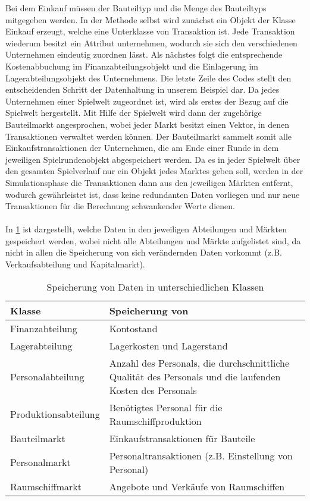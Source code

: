 Bei dem Einkauf müssen der Bauteiltyp und die Menge des Bauteiltyps mitgegeben werden. In der Methode selbst wird zunächst ein Objekt der Klasse Einkauf erzeugt, welche eine Unterklasse von Transaktion ist. Jede Transaktion wiederum besitzt ein Attribut unternehmen, wodurch sie sich den verschiedenen Unternehmen eindeutig zuordnen lässt. Als nächstes folgt die entsprechende Kostenabbuchung im Finanzabteilungsobjekt und die Einlagerung im Lagerabteilungsobjekt des Unternehmens. Die letzte Zeile des Codes stellt den entscheidenden Schritt der Datenhaltung in unserem Beispiel dar. Da jedes Unternehmen einer Spielwelt zugeordnet ist, wird als erstes der Bezug auf die Spielwelt hergestellt. Mit Hilfe der Spielwelt wird dann der zugehörige Bauteilmarkt angesprochen, wobei jeder Markt besitzt einen Vektor, in denen Transaktionen verwaltet werden können. Der Bauteilmarkt sammelt somit alle Einkaufstransaktionen der Unternehmen, die am Ende einer Runde in dem jeweiligen Spielrundenobjekt abgespeichert werden. Da es in jeder Spielwelt über den gesamten Spielverlauf nur ein Objekt jedes Marktes geben soll, werden in der Simulationsphase die Transaktionen dann aus den jeweiligen Märkten entfernt, wodurch gewährleistet ist, dass keine redundanten Daten vorliegen und nur neue Transaktionen für die Berechnung schwankender Werte dienen.
\\
\\
In \ref{tab:fachkonzept-implementierung-erläuterung-datenhaltung} ist dargestellt, welche Daten in den jeweiligen Abteilungen und Märkten gespeichert werden, wobei nicht alle Abteilungen und Märkte aufgelistet sind, da nicht in allen die Speicherung von sich verändernden Daten vorkommt (z.B. Verkaufsabteilung und Kapitalmarkt).

\begin{table}[ht]\small
     \centering
     \begin{tabular}{| p{4cm} |p{\textwidth -5cm} |}
          \hline
          Klasse & Speicherung von \\
          \hline \hline
          Finanzabteilung & Kontostand \\ \hline
          Lagerabteilung & Lagerkosten und Lagerstand  \\ \hline
          Personalabteilung & Anzahl des Personals, die durchschnittliche Qualität des Personals und die 			  laufenden Kosten des Personals \\ \hline
          Produktionsabteilung & Benötigtes Personal für die Raumschiffproduktion \\ \hline
          Bauteilmarkt & Einkaufstransaktionen für Bauteile \\ \hline
          Personalmarkt & Personaltransaktionen (z.B. Einstellung von Personal) \\ \hline
          Raumschiffmarkt & Angebote und Verkäufe von Raumschiffen \\ 
          \hline    
     \end{tabular}
     \caption{Speicherung von Daten in unterschiedlichen Klassen}
     \label{tab:fachkonzept-implementierung-erläuterung-datenhaltung}
\end{table}


